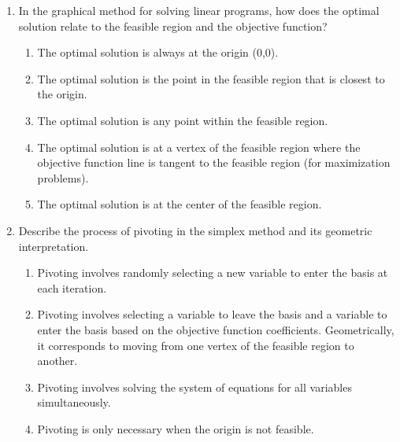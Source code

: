 \documentclass{article}%
\begin{document}
\begin{enumerate}
\begin{enumerate}
\item Basic variables are the slack variables, and non-basic variables are the decision variables. The simplex method only changes the values of non-basic variables.%
\item Basic and non-basic variables are randomly assigned at each iteration of the simplex method. Their values determine the movement between vertices.%
\item Basic variables are those with positive coefficients in the objective function, and non-basic variables are those with negative or zero coefficients. The simplex method only changes the values of non-basic variables.%
\end{enumerate}%
\vspace{1em}%
\item In the graphical method for solving linear programs, how does the optimal solution relate to the feasible region and the objective function?%
\begin{enumerate}%
\item The optimal solution is always at the origin (0,0).%
\item The optimal solution is the point in the feasible region that is closest to the origin.%
\item The optimal solution is any point within the feasible region.%
\item The optimal solution is at a vertex of the feasible region where the objective function line is tangent to the feasible region (for maximization problems).%
\item The optimal solution is at the center of the feasible region.%
\end{enumerate}%
\vspace{1em}%
\item Describe the process of pivoting in the simplex method and its geometric interpretation.%
\begin{enumerate}%
\item Pivoting involves randomly selecting a new variable to enter the basis at each iteration.%
\item Pivoting involves selecting a variable to leave the basis and a variable to enter the basis based on the objective function coefficients. Geometrically, it corresponds to moving from one vertex of the feasible region to another.%
\item Pivoting involves solving the system of equations for all variables simultaneously.%
\item Pivoting is only necessary when the origin is not feasible.%

\end{enumerate}
\end{enumerate}
\end{document}
